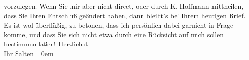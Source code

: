 \begin{ledgroupsized}[t]{13cm}
               vorzulegen. Wenn Sie mir aber nicht direct, oder durch K. Hoffmann mittheilen, dass Sie Ihren Entschluß geändert haben,
               dann bleibt’s bei Ihrem heutigen Brief.\pend
           \pstart
           Es ist wol überflüßig, zu betonen, dass ich persönlich dabei garnicht in Frage komme,
               und dass Sie sich \uline{nicht etwa durch eine Rücksicht auf
                  mich} sollen bestimmen laßen!\pend
           \pstart
           Herzlichst {\\[\baselineskip]}Ihr \spacefill\mbox{Salten}\pend
           \leftskip=0em{}
         
         \endnumbering{}\end{ledgroupsized}  \newcommand{\dateiname}{L03406}\newcommand{\titel}{Felix Salten an Arthur Schnitzler, 20. 1. 1905}\newcommand{\editorInnen}{Martin Anton Müller und Laura Untner}
      